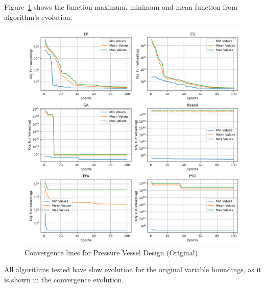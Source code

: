 
Figure~\ref{fig:pressure_vessel_problem_original_convergence} shows the
function maximum, minimum and mean function from algorithm's evolution:

\begin{figure}[H]
\centering
\caption{Convergence lines for Pressure Vessel Design (Original)}
\label{fig:pressure_vessel_problem_original_convergence}
\includegraphics[width=0.4 \textwidth]{images/pressure_vessel_problem_original_convergence.png}
\end{figure}

All algorithms tested have slow evolution for the original variable boundings, as it is shown in the convergence evolution.


